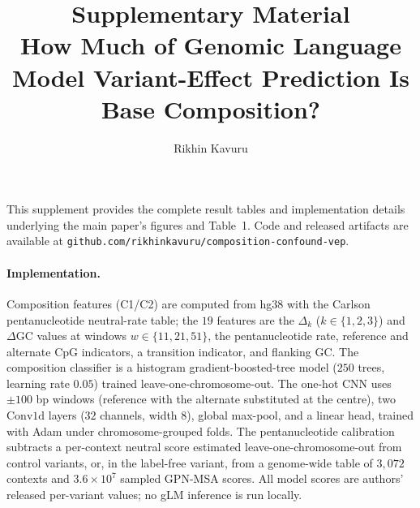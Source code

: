 \documentclass[11pt]{article}
\title{Supplementary Material\\[4pt]
\large How Much of Genomic Language Model Variant-Effect Prediction Is Base Composition?}
\author{Rikhin Kavuru}
\date{}
\begin{document}
\maketitle

This supplement provides the complete result tables and implementation details underlying the
main paper's figures and Table~1. Code and released artifacts are available at
\texttt{github.com/rikhinkavuru/composition-confound-vep}.

\paragraph{Implementation.} Composition features (C1/C2) are computed from hg38 with the
Carlson pentanucleotide neutral-rate table; the $19$ features are the $\Delta_k$
($k\in\{1,2,3\}$) and $\Delta$GC values at windows $w\in\{11,21,51\}$, the pentanucleotide
rate, reference and alternate CpG indicators, a transition indicator, and flanking GC. The
composition classifier is a histogram gradient-boosted-tree model ($250$ trees, learning rate
$0.05$) trained leave-one-chromosome-out. The one-hot CNN uses $\pm100$ bp windows (reference
with the alternate substituted at the centre), two $\mathrm{Conv1d}$ layers ($32$ channels,
width $8$), global max-pool, and a linear head, trained with Adam under chromosome-grouped
folds. The pentanucleotide calibration subtracts a per-context neutral score estimated
leave-one-chromosome-out from control variants, or, in the label-free variant, from a
genome-wide table of $3{,}072$ contexts and $3.6\times10^{7}$ sampled GPN-MSA scores. All
model scores are authors' released per-variant values; no gLM inference is run locally.
\end{document}

